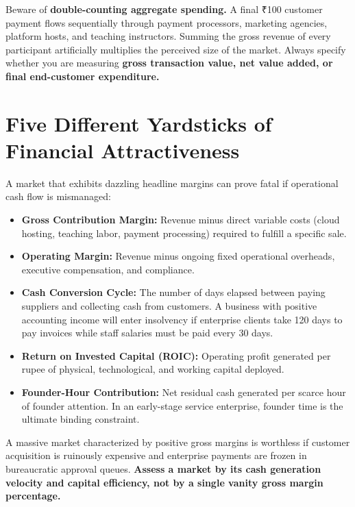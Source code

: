 Beware of \textbf{double-counting aggregate spending.} A final ₹100 customer payment flows sequentially through payment processors, marketing agencies, platform hosts, and teaching instructors. Summing the gross revenue of every participant artificially multiplies the perceived size of the market. Always specify whether you are measuring \textbf{gross transaction value, net value added, or final end-customer expenditure.}

\section{Five Different Yardsticks of Financial Attractiveness}

A market that exhibits dazzling headline margins can prove fatal if operational cash flow is mismanaged:
\begin{itemize}[leftmargin=12pt,itemsep=2pt,topsep=1pt]
  \item \textbf{Gross Contribution Margin:} Revenue minus direct variable costs (cloud hosting, teaching labor, payment processing) required to fulfill a specific sale.
  \item \textbf{Operating Margin:} Revenue minus ongoing fixed operational overheads, executive compensation, and compliance.
  \item \textbf{Cash Conversion Cycle:} The number of days elapsed between paying suppliers and collecting cash from customers. A business with positive accounting income will enter insolvency if enterprise clients take 120 days to pay invoices while staff salaries must be paid every 30 days.
  \item \textbf{Return on Invested Capital (ROIC):} Operating profit generated per rupee of physical, technological, and working capital deployed.
  \item \textbf{Founder-Hour Contribution:} Net residual cash generated per scarce hour of founder attention. In an early-stage service enterprise, founder time is the ultimate binding constraint.
\end{itemize}

A massive market characterized by positive gross margins is worthless if customer acquisition is ruinously expensive and enterprise payments are frozen in bureaucratic approval queues. \textbf{Assess a market by its cash generation velocity and capital efficiency, not by a single vanity gross margin percentage.}
